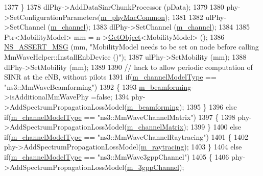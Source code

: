\begin{DoxyCode}
1377         \}
1378         dlPhy->AddDataSinrChunkProcessor (pData);
1379 
1380         phy->SetConfigurationParameters(\hyperlink{classns3_1_1MmWaveHelper_a6aaa35de743b9a88998de0128b1046b4}{m\_phyMacCommon});
1381 
1382         ulPhy->SetChannel (\hyperlink{classns3_1_1MmWaveHelper_adac6d83bc2acef8b7dbd9fc668207d95}{m\_channel});
1383         dlPhy->SetChannel (\hyperlink{classns3_1_1MmWaveHelper_adac6d83bc2acef8b7dbd9fc668207d95}{m\_channel});
1384 
1385         Ptr<MobilityModel> mm = n->\hyperlink{classns3_1_1Object_a13e18c00017096c8381eb651d5bd0783}{GetObject}<MobilityModel> ();
1386         \hyperlink{assert_8h_aff5ece9066c74e681e74999856f08539}{NS\_ASSERT\_MSG} (mm, \textcolor{stringliteral}{"MobilityModel needs to be set on node before calling
       MmWaveHelper::InstallEnbDevice ()"});
1387         ulPhy->SetMobility (mm);
1388         dlPhy->SetMobility (mm);
1389 
1390         \textcolor{comment}{// hack to allow periodic computation of SINR at the eNB, without pilots}
1391         \textcolor{keywordflow}{if}(\hyperlink{classns3_1_1MmWaveHelper_aec88d691230f0db9448a7f953301bb24}{m\_channelModelType} == \textcolor{stringliteral}{"ns3::MmWaveBeamforming"})
1392         \{
1393                 \hyperlink{classns3_1_1MmWaveHelper_a4fa071b6d755f32a684906150660b381}{m\_beamforming}->isAdditionalMmWavePhy =\textcolor{keyword}{false};
1394                 phy->AddSpectrumPropagationLossModel(\hyperlink{classns3_1_1MmWaveHelper_a4fa071b6d755f32a684906150660b381}{m\_beamforming});
1395         \}
1396         \textcolor{keywordflow}{else} \textcolor{keywordflow}{if}(\hyperlink{classns3_1_1MmWaveHelper_aec88d691230f0db9448a7f953301bb24}{m\_channelModelType} == \textcolor{stringliteral}{"ns3::MmWaveChannelMatrix"})
1397         \{
1398                 phy->AddSpectrumPropagationLossModel(\hyperlink{classns3_1_1MmWaveHelper_a731a9e28a12edacd78b96800025db070}{m\_channelMatrix});
1399         \}
1400         \textcolor{keywordflow}{else} \textcolor{keywordflow}{if}(\hyperlink{classns3_1_1MmWaveHelper_aec88d691230f0db9448a7f953301bb24}{m\_channelModelType} == \textcolor{stringliteral}{"ns3::MmWaveChannelRaytracing"})
1401         \{
1402                 phy->AddSpectrumPropagationLossModel(\hyperlink{classns3_1_1MmWaveHelper_a99e1ebbb84d122ea60a9fe7c1bb44528}{m\_raytracing});
1403         \}
1404         \textcolor{keywordflow}{else} \textcolor{keywordflow}{if}(\hyperlink{classns3_1_1MmWaveHelper_aec88d691230f0db9448a7f953301bb24}{m\_channelModelType} == \textcolor{stringliteral}{"ns3::MmWave3gppChannel"})
1405         \{
1406                 phy->AddSpectrumPropagationLossModel(\hyperlink{classns3_1_1MmWaveHelper_a1cbb083568aa048da48260725e3cf4a4}{m\_3gppChannel});

\end{DoxyCode}
